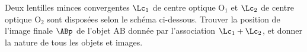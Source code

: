 \documentclass[a4paper, 10pt, final, garamond]{book}
\begin{document}
\begin{enumerate}[label=\sqenumi, leftmargin=10pt]
\begin{isd}[righthand ratio=.3]
\begin{center}
{			}
		\end{center}
	\end{isd}
	 Deux lentilles minces convergentes $\Lc_1$ de centre optique O$_1$ et
	$\Lc_2$ de centre optique O$_2$ sont disposées selon le schéma ci-dessous.
	Trouver la position de l'image finale $\ABp$ de l'objet AB donnée par
	l'association $\Lc_1 + \Lc_2$, et donner la nature de tous les objets et
	images.
	\begin{center}
	\end{center}
\end{enumerate}
\end{document}
